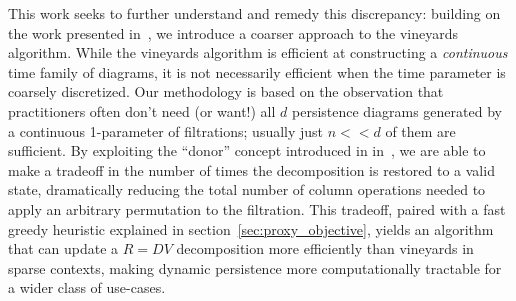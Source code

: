 \documentclass{siamart190516}
\begin{document}
This work seeks to further understand and remedy this discrepancy: building on the work presented in~\cite{busaryev2010tracking}, we introduce a coarser approach to the vineyards algorithm.
While the vineyards algorithm is efficient at constructing a \emph{continuous} time family of diagrams, it is not necessarily efficient when the time parameter is coarsely discretized.
Our methodology is based on the observation that practitioners often don't need (or want!) all $d$ persistence diagrams generated by a continuous 1-parameter of filtrations; usually just $n << d$ of them are sufficient.   
By exploiting the ``donor'' concept introduced in in~\cite{busaryev2010tracking}, we are able to make a tradeoff in the number of times the decomposition is restored to a valid state, dramatically reducing the total number of column operations needed to apply an arbitrary permutation to the filtration. This tradeoff, paired with a fast greedy heuristic explained in section~\ref{sec:proxy_objective}, yields an algorithm that can update a $R = DV$ decomposition more efficiently than vineyards in sparse contexts, making dynamic persistence more computationally tractable for a wider class of use-cases. 


 
\end{document}
